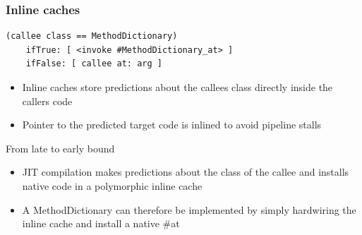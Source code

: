 \documentclass{beamer}
\begin{document}
\begin{frame}[fragile]
    \frametitle{Inline caches}

    \begin{lstlisting}
(callee class == MethodDictionary)
    ifTrue: [ <invoke #MethodDictionary_at> ]
    ifFalse: [ callee at: arg ]
    \end{lstlisting}

    \begin{itemize}
        \item Inline caches store predictions about the callees class directly inside the callers code
        \item Pointer to the predicted target code is inlined to avoid pipeline stalls
    \end{itemize}
\end{frame}

\begin{frame}{From late to early bound}
        \begin{itemize}
            \item JIT compilation makes predictions about the class of the callee and installs native code in a polymorphic inline cache
            \item A MethodDictionary can therefore be implemented by simply hardwiring the inline cache and install a native \#at
        \end{itemize}
\end{frame}
\end{document}

